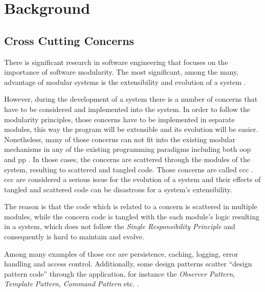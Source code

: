 
\chapter{Background}\label{Background}

\section{Cross Cutting Concerns}\label{Cross Cutting Concerns}
There is significant research in software engineering that focuses on the importance of software modularity. 
The most significant, among the many, advantage of modular systems is the extensibility and evolution of a system \cite{parnas1972criteria}.

However, during the development of a system there is a number of concerns that have to be considered and implemented into the system. 
In order to follow the modularity principles, those concerns have to be implemented in separate modules, this way the program will be extensible and its evolution will be easier.
Nonetheless, many of those concerns can not fit into the existing modular mechanisms in any of the existing programming paradigms including both \ac{oop} and \ac{pp} \cite{kiczales1997aspect}. 
In those cases, the concerns are scattered through the modules of the system, resulting to scattered and tangled code. 
Those concerns are called \acrlong{ccc} \cite{hannemann2005role}.
\ac{ccc} are considered a serious issue for the evolution of a system and their effects of tangled and scattered code can be disastrous for a system's extensibility.

The reason is that the code which is related to a concern is scattered in multiple modules, while the concern code is tangled with the each module's logic resulting in a system, which does not follow the \textit{Single Responsibility Principle} and consequently is hard to maintain and evolve.

Among many examples of those \ac{ccc} are persistence, caching, logging, error handling \cite{lippert2000study} and access control. 
Additionally, some design patterns scatter ``design pattern code'' through the application, for instance the \textit{Observer Pattern}, \textit{Template Pattern}, \textit{Command Pattern} etc. \cite{hannemann2002design} \cite{marin2004refactoring}.

